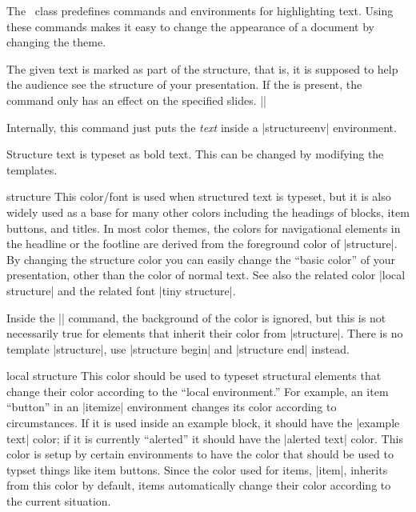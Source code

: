 The \beamer\ class predefines commands and environments for highlighting text. Using these commands makes it easy to change the appearance of a document by changing the theme.

\begin{command}{\structure{}}
  The given text is marked as part of the structure, that is, it is supposed to help the audience see the structure of your presentation. If the  is present, the command only has an effect on the specified slides.
  \example
  ||

  Internally, this command just puts the \emph{text} inside a |structureenv| environment.

  \articlenote
  Structure text is typeset as bold text. This can be changed by modifying the templates.

  \begin{element}{structure}\no\yes\yes
    This color/font is used when structured text is typeset, but it is also widely used as a base for many other colors including the headings of blocks, item buttons, and titles. In most color themes, the colors for navigational elements in the headline or the footline are derived from the foreground color of |structure|. By changing the structure color you can easily change the ``basic color'' of your presentation, other than the color of normal text. See also the related color |local structure| and the related font |tiny structure|.

    Inside the |\structure| command, the background of the color is ignored, but this is not necessarily true for elements that inherit their color from |structure|. There is no template |structure|, use |structure begin| and |structure end| instead.
  \end{element}

  \begin{element}{local structure}\no\yes\no
    This color should be used to typeset structural elements that change their color according to the ``local environment.'' For example, an item ``button'' in an |itemize| environment changes its color according to circumstances. If it is used inside an example block, it should have the |example text| color; if it is currently ``alerted'' it should have the |alerted text| color. This color is setup by certain environments to have the color that should be used to typset things like item buttons. Since the color used for items, |item|, inherits from this color by default, items automatically change their color according to the current situation.


\end{element}
\end{command}
